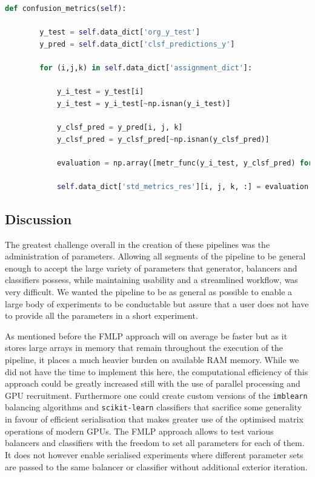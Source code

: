 \begin{lstlisting}[language=Python, numbers=none]
def confusion_metrics(self):
	
        y_test = self.data_dict['org_y_test']
        y_pred = self.data_dict['clsf_predictions_y']

        for (i,j,k) in self.data_dict['assignment_dict']:
            
            y_i_test = y_test[i]
            y_i_test = y_i_test[~np.isnan(y_i_test)]

            y_clsf_pred = y_pred[i, j, k]
            y_clsf_pred = y_clsf_pred[~np.isnan(y_clsf_pred)]

            evaluation = np.array([metr_func(y_i_test, y_clsf_pred) for (name, metr_func) in self.std_metric_list])

            self.data_dict['std_metrics_res'][i, j, k, :] = evaluation
\end{lstlisting}


\subsection{Discussion}

The greatest challenge overall in the creation of these pipelines was the administration of parameters. 
Allowing all segments of the pipeline to be general enough to accept the large variety of parameters that generator, balancers and classifiers possess,
while maintaining usability and a streamlined workflow, was very difficult.
We wanted the pipeline to be as general as possible to enable a large body of experiments to be conductable but assure that a user does not have to provide
all the parameters in a short experiment.

As mentioned before the FMLP approach will on average be faster but as it stores large arrays in memory that remain throughout the execution of the pipeline,
it places a much heavier burden on available RAM memory. 
While we did not have the time to implement this here, the computational efficiency of this approach could be greatly increased still 
with the use of parallel processing and GPU recruitment. 
Furthermore one could create custom versions of the \texttt{imblearn} balancing algorithms and \texttt{scikit-learn} classifiers that sacrifice some generality
in favour of efficient serialisation that makes greater use of the optimised matrix operations of modern GPUs.
The FMLP approach allows to test various balancers and classifiers with the freedom to set all parameters for each of them.
It does not however enable serialised experiments where different parameter sets are passed to the same balancer or classifier without additional exterior iteration.








